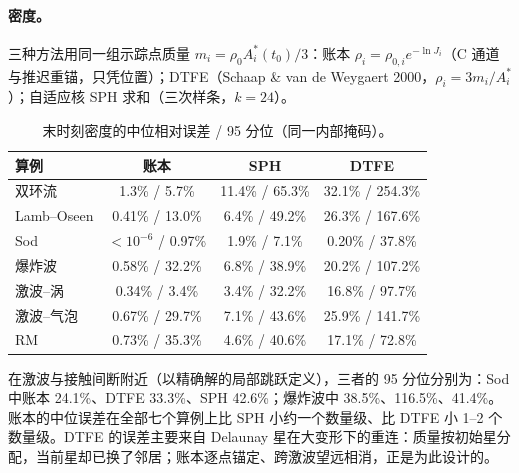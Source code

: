 \paragraph{密度。}三种方法用同一组示踪点质量 $m_i=\rho_0A^\ast_i(t_0)/3$：账本 $\rho_i=\rho_{0,i}e^{-\ln J_i}$（C 通道与推迟重锚，只凭位置）；DTFE（Schaap \& van de Weygaert 2000，$\rho_i=3m_i/A^\ast_i$）；自适应核 SPH 求和（三次样条，$k=24$）。
\begin{table}[!htbp]\centering\small\caption{末时刻密度的中位相对误差 / 95 分位（同一内部掩码）。}\begin{tabular}{lccc}\toprule 算例 & 账本 & SPH & DTFE\\\midrule
双环流 & 1.3\% / 5.7\% & 11.4\% / 65.3\% & 32.1\% / 254.3\%\\
Lamb–Oseen & 0.41\% / 13.0\% & 6.4\% / 49.2\% & 26.3\% / 167.6\%\\
Sod & $<10^{-6}$ / 0.97\% & 1.9\% / 7.1\% & 0.20\% / 37.8\%\\
爆炸波 & 0.58\% / 32.2\% & 6.8\% / 38.9\% & 20.2\% / 107.2\%\\
激波–涡 & 0.34\% / 3.4\% & 3.4\% / 32.2\% & 16.8\% / 97.7\%\\
激波–气泡 & 0.67\% / 29.7\% & 7.1\% / 43.6\% & 25.9\% / 141.7\%\\
RM & 0.73\% / 35.3\% & 4.6\% / 40.6\% & 17.1\% / 72.8\%\\
\bottomrule\end{tabular}\end{table}
在激波与接触间断附近（以精确解的局部跳跃定义），三者的 95 分位分别为：Sod 中账本 24.1\%、DTFE 33.3\%、SPH 42.6\%；爆炸波中 38.5\%、116.5\%、41.4\%。账本的中位误差在全部七个算例上比 SPH 小约一个数量级、比 DTFE 小 1–2 个数量级。DTFE 的误差主要来自 Delaunay 星在大变形下的重连：质量按初始星分配，当前星却已换了邻居；账本逐点锚定、跨激波望远相消，正是为此设计的。

